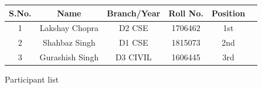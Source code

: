 \documentclass[12pt, a4 paper]{article}
\begin{document}
\begin{table}[h!]
  \begin{center}
    \begin{tabular}{|c|c|c|c|c|c|} 
    \toprule %
      \textbf{S.No.} & \textbf{Name} & \textbf{Branch/Year} & \textbf{Roll No.} &\textbf{Position} \\
      \midrule %
      1 & Lakshay Chopra  & D2 CSE   & 1706462 & 1st \\
      2 & Shahbaz Singh   & D1 CSE   & 1815073 & 2nd \\
      3 & Gurashish Singh & D3 CIVIL & 1606445 & 3rd \\

      \bottomrule %
    \end{tabular}
  \end{center}
\end{table}

\newpage

\begin{center}
\huge Participant list
\end{center}
\end{document}
